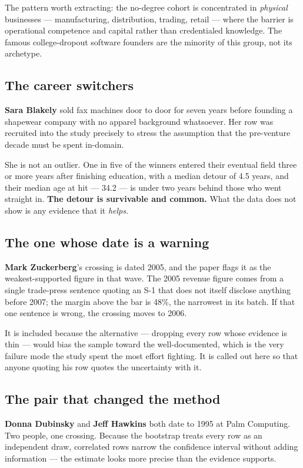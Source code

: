 \documentclass[11pt]{article}
\begin{document}
The pattern worth extracting: the no-degree cohort is concentrated in
\emph{physical} businesses --- manufacturing, distribution, trading, retail ---
where the barrier is operational competence and capital rather than credentialed
knowledge. The famous college-dropout software founders are the minority of this
group, not its archetype.

\subsection*{The career switchers}

\textbf{Sara Blakely} sold fax machines door to door for seven years before
founding a shapewear company with no apparel background whatsoever. Her row was
recruited into the study precisely to stress the assumption that the pre-venture
decade must be spent in-domain.

She is not an outlier. One in five of the winners entered their eventual field
three or more years after finishing education, with a median detour of 4.5
years, and their median age at hit --- 34.2 --- is under two years behind those
who went straight in. \textbf{The detour is survivable and common.} What the data
does not show is any evidence that it \emph{helps}.

\subsection*{The one whose date is a warning}

\textbf{Mark Zuckerberg}'s crossing is dated 2005, and the paper flags it as the
weakest-supported figure in that wave. The 2005 revenue figure comes from a
single trade-press sentence quoting an S-1 that does not itself disclose
anything before 2007; the margin above the bar is 48\%, the narrowest in its
batch. If that one sentence is wrong, the crossing moves to 2006.

It is included because the alternative --- dropping every row whose evidence is
thin --- would bias the sample toward the well-documented, which is the very
failure mode the study spent the most effort fighting. It is called out here so
that anyone quoting his row quotes the uncertainty with it.

\subsection*{The pair that changed the method}

\textbf{Donna Dubinsky} and \textbf{Jeff Hawkins} both date to 1995 at Palm
Computing. Two people, one crossing. Because the bootstrap treats every row as
an independent draw, correlated rows narrow the confidence interval without
adding information --- the estimate looks more precise than the evidence
supports.
\end{document}
